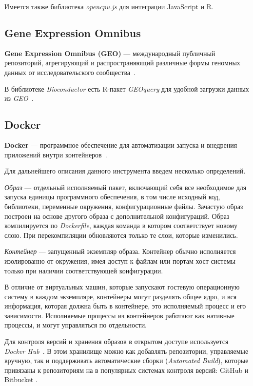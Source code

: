 \documentclass[annotation,specification]{itmo-student-thesis}
\begin{document}
Имеется также библиотека \textit{opencpu.js} для интеграции JavaScript и R.

\subsection{Gene Expression Omnibus}
\textbf{Gene Expression Omnibus (GEO)} --- международный публичный репозиторий, агрегирующий и распространяющий различные формы геномных данных от исследовательского сообщества~\cite{geo}.

В библиотеке \emph{Bioconductor} есть R-пакет \emph{GEOquery} для удобной загрузки данных из \emph{GEO}~\cite{geoquery}.

\subsection{Docker}
\textbf{Docker} --- программное обеспечение для автоматизации запуска и внедрения приложений внутри контейнеров~\cite{docker}.

Для дальнейшего описания данного инструмента введем несколько определений.

\textit{Образ} --- отдельный исполняемый пакет, включающий себя все необходимое для запуска единицы программного обеспечения, в том числе исходный код, библиотеки, переменные окружения, конфигурационные файлы. Зачастую образ построен на основе другого образа с дополнительной конфигураций. Образ компилируется по \textit{Dockerfile}, каждая команда в котором соответствует новому слою. При перекомпиляции обновляются только те слои, которые изменились. 

\textit{Контейнер} --- запущенный экземпляр образа. Контейнер обычно исполняется изолированно от окружения, имея доступ к файлам или портам хост-системы только при наличии соответствующей конфигурации.

В отличие от виртуальных машин, которые запускают гостевую операционную систему в каждом экземпляре, контейнеры могут разделять общее ядро, и вся информация, которая должна быть в контейнере, это исполняемый процесс и его зависимости. Исполняемые процессы из контейнеров работают как нативные процессы, и могут управляться по отдельности. 

Для контроля версий и хранения образов в открытом доступе используется \emph{Docker Hub}~\cite{dhub}. В этом хранилище можно как добавлять репозитории, управляемые вручную, так и поддерживать автоматические сборки (\textit{Automated Build}), которые привязаны к репозиториям на в популярных системах контроля версий: GitHub \cite{github} и Bitbucket \cite{bitbucket}.
\end{document}
